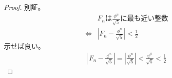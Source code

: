 \documentclass[a4paper,11pt]{jsarticle}
\begin{document}
\begin{proof}
別証。
\begin{align}
&F_nは\frac{\phi^n}{\sqrt{5}}に最も近い整数\\
\Leftrightarrow& \left| F_n - \frac{\phi^n}{\sqrt{5}} \right| < \frac{1}{2}
\end{align}
示せば良い。
\begin{align}
\left| F_n - \frac{\phi^n}{\sqrt{5}} \right|
= \left| \frac{\psi^n}{\sqrt{5}} \right|
< \frac{\psi^0}{\sqrt{5}}
< \frac{1}{2}
\end{align}

\end{proof}
\end{document}
